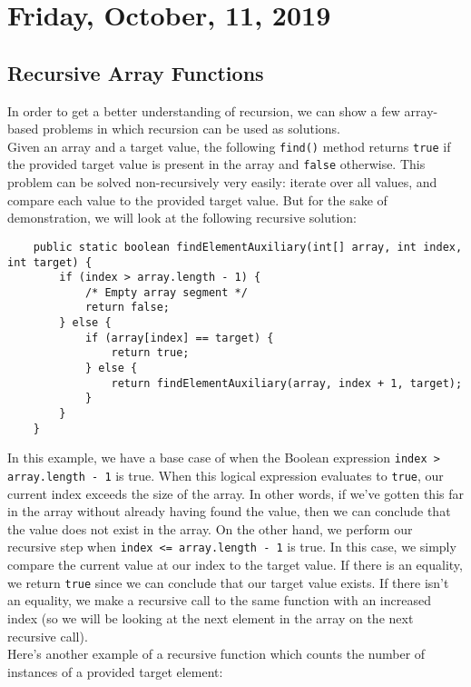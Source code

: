 \section{Friday, October, 11, 2019}

\subsection{Recursive Array Functions}

In order to get a better understanding of recursion, we can show a few array-based problems in which recursion can be used as solutions. \\

\noindent Given an array and a target value, the following \verb!find()! method returns \verb!true! if the provided target value is present in the array and \verb!false! otherwise. This problem can be solved non-recursively very easily: iterate over all values, and compare each value to the provided target value. But for the sake of demonstration, we will look at the following recursive solution:

\noindent
\begin{lstlisting}
	public static boolean findElementAuxiliary(int[] array, int index, int target) {
		if (index > array.length - 1) {
			/* Empty array segment */
			return false;
		} else {
			if (array[index] == target) {
				return true;
			} else {
				return findElementAuxiliary(array, index + 1, target);
			}
		}
	}
\end{lstlisting}

In this example, we have a base case of when the Boolean expression \verb!index > array.length - 1! is true. When this logical expression evaluates to \verb!true!, our current index exceeds the size of the array. In other words, if we've gotten this far in the array without already having found the value, then we can conclude that the value does not exist in the array. On the other hand, we perform our recursive step when \verb!index <= array.length - 1! is true. In this case, we simply compare the current value at our index to the target value. If there is an equality, we return \verb!true! since we can conclude that our target value exists. If there isn't an equality, we make a recursive call to the same function with an increased index (so we will be looking at the next element in the array on the next recursive call). \\

Here's another example of a recursive function which counts the number of instances of a provided target element:

